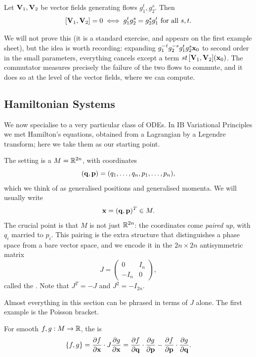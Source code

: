 \documentclass[a4paper]{scrartcl}
\begin{document}
\begin{proposition}
	Let $\mathbf{V}_1, \mathbf{V}_2$ be vector fields generating flows $g_1^t, g_2^s$. Then
	$$
	[\mathbf{V}_1, \mathbf{V}_2] = 0 \iff g_1^t g_2^s = g_2^s g_1^t \text{ for all } s,t.
	$$
\end{proposition}

We will not prove this (it is a standard exercise, and appears on the first example sheet), but the idea is worth recording: expanding $g_1^{-t}g_2^{-s}g_1^t g_2^s \mathbf{x}_0$ to second order in the small parameters, everything cancels except a term $st\,[\mathbf{V}_1, \mathbf{V}_2](\mathbf{x}_0)$. The commutator measures precisely the failure of the two flows to commute, and it does so at the level of the vector fields, where we can compute.

\subsection{Hamiltonian Systems}

We now specialise to a very particular class of ODEs. In IB Variational Principles we met Hamilton's equations, obtained from a Lagrangian by a Legendre transform; here we take them as our starting point.

The setting is a  $M = \mathbb{R}^{2n}$, with coordinates
$$
(\mathbf{q}, \mathbf{p}) = (q_1, \dots, q_n, p_1, \dots, p_n),
$$
which we think of as generalised positions and generalised momenta. We will usually write
$$
\mathbf{x} = (\mathbf{q}, \mathbf{p})^T \in M.
$$
The crucial point is that $M$ is not just $\mathbb{R}^{2n}$: the coordinates come \emph{paired up}, with $q_i$ married to $p_i$. This pairing is the extra structure that distinguishes a phase space from a bare vector space, and we encode it in the $2n \times 2n$ antisymmetric matrix
$$
J = \begin{pmatrix} 0 & I_n \\ -I_n & 0\end{pmatrix},
$$
called the . Note that $J^T = -J$ and $J^2 = -I_{2n}$.

Almost everything in this section can be phrased in terms of $J$ alone. The first example is the Poisson bracket.

\begin{definition}
	For smooth $f, g : M \to \mathbb{R}$, the  is
	$$
	\{f, g\} = \frac{\partial f}{\partial \mathbf{x}} \cdot J \frac{\partial g}{\partial \mathbf{x}} = \frac{\partial f}{\partial \mathbf{q}}\cdot \frac{\partial g}{\partial \mathbf{p}} - \frac{\partial f}{\partial \mathbf{p}} \cdot \frac{\partial g}{\partial \mathbf{q}}.
	$$
\end{definition}
\end{document}
